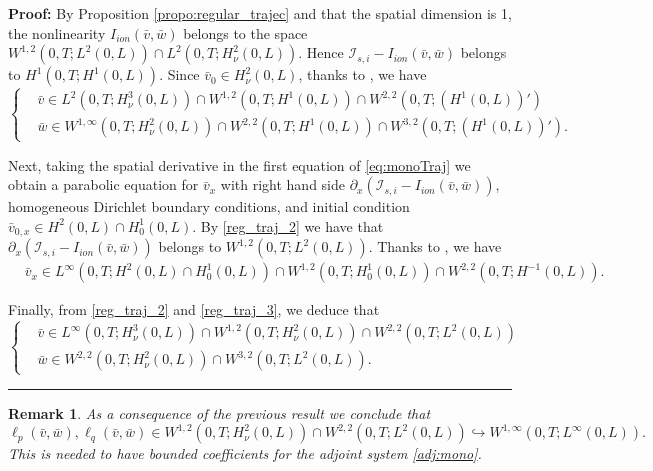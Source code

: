 \documentclass[10pt]{article}
\newtheorem{rmq}{Remark}
\newenvironment{proof}[1][Proof]
{\noindent\textbf{#1:} }{\hfill\rule{0.5em}{0.5em}}
\def\\Phivec{\mathbf{\Phi}}
\begin{document}
\begin{proof}
    By  Proposition \ref{propo:regular_trajec} and that the spatial dimension is 1, the nonlinearity $I_{ion}(\bar v,\bar w)$
    belongs to the space $W^{1,2}(0,T;L^2(0,L))\cap L^2(0,T;H^2_\nu(0,L))$. Hence $\mathcal{I}_{s,i}-I_{ion}(\bar v,\bar w)$ belongs to $H^1(0,T;H^1(0,L))$.
    Since $\bar v_0\in H^2_\nu(0,L)$, thanks to \cite[Theorem $5$, p. $361$]{evans}, we have
\begin{equation}\label{reg_traj_2}
\left\{
    \begin{alignedat}{2}
        &\bar v\in L^2(0,T;H^3_\nu(0,L))\cap W^{1,2}(0,T;H^1(0,L))\cap W^{2,2}(0,T;(H^1(0,L))')\\
        &\bar w\in  W^{1,\infty}(0,T;H^2_\nu(0,L))\cap W^{2,2}(0,T;H^1(0,L))\cap W^{3,2}(0,T;(H^1(0,L))').
    \end{alignedat}
    \right.
\end{equation}

    Next, taking  the spatial derivative in the first equation of \eqref{eq:monoTraj}  we obtain
    a parabolic equation for $\bar v_x$ with right hand side $\partial_x(\mathcal{I}_{s,i}-I_{ion}(\bar v,\bar w))$, homogeneous Dirichlet boundary
    conditions, and initial condition $\bar v_{0,x}\in H^2(0,L)\cap H^1_0(0,L)$. By \eqref{reg_traj_2} we have that
     $\partial_x(\mathcal{I}_{s,i}-I_{ion}(\bar v,\bar w))$ belongs to $W^{1,2}(0,T;L^2(0,L))$. Thanks to \cite[Theorem $5$, p. $361$]{evans}, we have
\begin{equation}\label{reg_traj_3}
    \begin{alignedat}{2}
        &\bar v_x\in L^\infty(0,T; H^2(0,L)\cap H^1_0(0,L))\cap W^{1,2}(0,T;H^1_0(0,L))\cap W^{2,2}(0,T;H^{-1}(0,L)).
    \end{alignedat}
\end{equation}

    Finally, from \eqref{reg_traj_2} and \eqref{reg_traj_3}, we deduce that
\begin{equation}\label{reg_traj_4}
\left\{
    \begin{alignedat}{2}
         &\bar v\in L^\infty(0,T; H^3_\nu(0,L))\cap W^{1,2}(0,T;H^2_\nu(0,L))\cap W^{2,2}(0,T;L^2(0,L))\\
        &\bar w\in  W^{2,2}(0,T;H^2_\nu(0,L))\cap W^{3,2}(0,T;L^2(0,L)).
    \end{alignedat}
    \right.
\end{equation}
\end{proof}

\begin{rmq}\label{rmk:lplq}
	As a consequence of the previous result we conclude that
$$
	\ell_p(\bar v,\bar w),\ell_q(\bar v,\bar w)\in  W^{1,2}(0,T;H^2_\nu(0,L))\cap W^{2,2}(0,T;L^2(0,L))\hookrightarrow
	W^{1,\infty}(0,T;L^\infty(0,L)).
$$
	{ This is needed to have bounded coefficients for the adjoint system \eqref{adj:mono}.}
\end{rmq}
\end{document}

